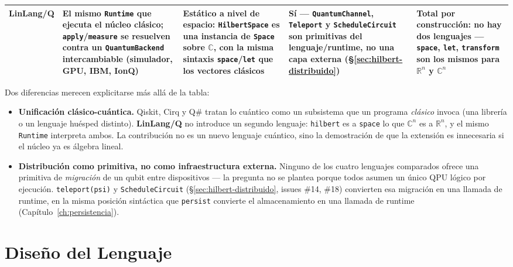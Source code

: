\documentclass[12pt, a4paper, openany]{report}
\theoremstyle{definition}
\newcommand{\linlangQ}{\textbf{LinLang/Q}}
\begin{document}
\begin{table}[H]
\begin{tabularx}{\linewidth}{@{}L{1.8cm}L{3.3cm}L{3.3cm}L{2.3cm}L{3.3cm}@{}}
\addlinespace
\textbf{\linlangQ{}} & El mismo \texttt{Runtime} que ejecuta el núcleo clásico; \texttt{apply}/\texttt{measure} se resuelven contra un \texttt{QuantumBackend} intercambiable (simulador, GPU, IBM, IonQ) & Estático a nivel de espacio: \texttt{HilbertSpace} es una instancia de \texttt{Space} sobre $\mathbb{C}$, con la misma sintaxis \texttt{space}/\texttt{let} que los vectores clásicos & \textbf{Sí} — \texttt{QuantumChannel}, \texttt{Teleport} y \texttt{ScheduleCircuit} son primitivas del lenguaje/runtime, no una capa externa (\S\ref{sec:hilbert-distribuido}) & Total por construcción: no hay dos lenguajes — \texttt{space}, \texttt{let}, \texttt{transform} son los mismos para $\mathbb{R}^n$ y $\mathbb{C}^n$ \\
\bottomrule
\end{tabularx}
\end{table}

Dos diferencias merecen explicitarse más allá de la tabla:

\begin{itemize}
  \item \textbf{Unificación clásico-cuántica.} Qiskit, Cirq y Q\# tratan lo cuántico como un subsistema que un programa \emph{clásico} invoca (una librería o un lenguaje huésped distinto). \linlangQ{} no introduce un segundo lenguaje: \texttt{hilbert} es a \texttt{space} lo que $\mathbb{C}^n$ es a $\mathbb{R}^n$, y el mismo \texttt{Runtime} interpreta ambos. La contribución no es un nuevo lenguaje cuántico, sino la demostración de que la extensión es innecesaria si el núcleo ya es álgebra lineal.
  \item \textbf{Distribución como primitiva, no como infraestructura externa.} Ninguno de los cuatro lenguajes comparados ofrece una primitiva de \emph{migración} de un qubit entre dispositivos — la pregunta no se plantea porque todos asumen un único QPU lógico por ejecución. \texttt{teleport(psi)} y \texttt{ScheduleCircuit} (\S\ref{sec:hilbert-distribuido}, issues \#14, \#18) convierten esa migración en una llamada de runtime, en la misma posición sintáctica que \texttt{persist} convierte el almacenamiento en una llamada de runtime (Capítulo~\ref{ch:persistencia}).
\end{itemize}

\chapter{Diseño del Lenguaje}
\label{ch:diseno}
\end{document}
